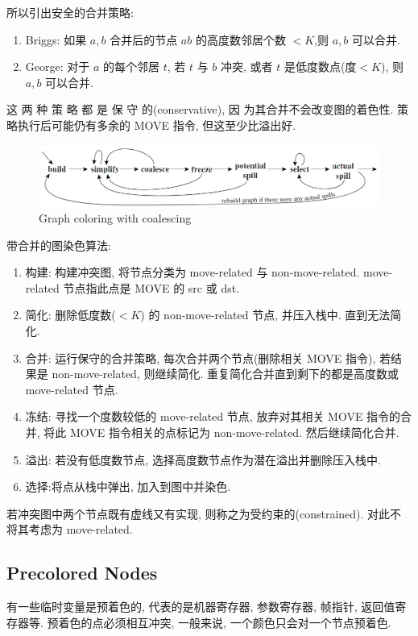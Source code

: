 所以引出安全的合并策略:
\begin{enumerate}
    \item Briggs: 如果 $a,b$ 合并后的节点 $ab$ 的高度数邻居个数 $<K$,则 $a, b$ 可以合并.
    \item George: 对于 $a$ 的每个邻居 $t$, 若 $t$ 与 $b$ 冲突, 或者 $t$ 是低度数点(度$<K$), 则 $a,b$ 可以合并. 
\end{enumerate}

这 两 种 策 略 都 是 保 守 的(conservative), 因 为其合并不会改变图的着色性. 策略执行后可能仍有多余的 MOVE 指令, 但这至少比溢出好.


\begin{figure}[H]
    \centering
    \includegraphics[width=0.84\linewidth]{pic/CP11/Graph coloring with coalescing}
    \caption{Graph coloring with coalescing}
\end{figure}



带合并的图染色算法:
\begin{enumerate}
    \item 构建: 构建冲突图, 将节点分类为 move-related 与 non-move-related. move-related 节点指此点是 MOVE 的 src 或 dst. 
    \item 简化: 删除低度数($<K$) 的 non-move-related 节点, 并压入栈中. 直到无法简化. 
    \item 合并: 运行保守的合并策略, 每次合并两个节点(删除相关 MOVE 指令), 若结果是 non-move-related, 则继续简化. 重复简化合并直到剩下的都是高度数或 move-related 节点. 
    \item 冻结: 寻找一个度数较低的 move-related 节点, 放弃对其相关 MOVE 指令的合并, 将此 MOVE 指令相关的点标记为 non-move-related. 然后继续简化合并.
    \item 溢出: 若没有低度数节点, 选择高度数节点作为潜在溢出并删除压入栈中. 
    \item 选择:将点从栈中弹出, 加入到图中并染色. 
\end{enumerate}

若冲突图中两个节点既有虚线又有实现, 则称之为受约束的(constrained). 对此不将其考虑为 move-related. 


\subsection{Precolored Nodes}
有一些临时变量是预着色的, 代表的是机器寄存器, 参数寄存器, 帧指针, 返回值寄存器等. 预着色的点必须相互冲突, 一般来说, 一个颜色只会对一个节点预着色. 

